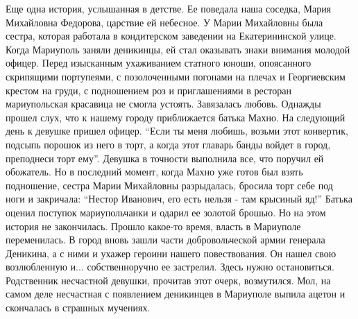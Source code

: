 Еще одна история, услышанная в детстве. Ее поведала наша соседка, Мария
Михайловна Федорова, царствие ей небесное. У Марии Михайловны была сестра,
которая работала в кондитерском заведении на Екатерининской улице. Когда
Мариуполь заняли деникинцы, ей стал оказывать знаки внимания  молодой офицер.
Перед изысканным ухаживанием статного юноши, опоясанного скрипящими портупеями,
с позолоченными погонами на плечах и Георгиевским крестом на груди, с
подношением роз и приглашениями в ресторан мариупольская красавица не смогла
устоять. Завязалась любовь. Однажды прошел слух, что к нашему городу
приближается батька Махно. На следующий день к девушке пришел офицер. \enquote{Если ты
меня любишь, возьми этот конвертик, подсыпь порошок из него в торт, а когда
этот главарь банды войдет в город, преподнеси торт ему}. Девушка в точности
выполнила все, что поручил ей обожатель. Но в последний момент, когда Махно уже
готов был взять подношение, сестра Марии Михайловны разрыдалась, бросила торт
себе под ноги и закричала: \enquote{Нестор Иванович, его есть нельзя - там крысиный
яд!} Батька оценил поступок мариупольчанки и одарил ее золотой брошью. Но на
этом история не закончилась. Прошло какое-то время, власть в Мариуполе
переменилась. В город вновь зашли части добровольческой армии генерала
Деникина, а с ними и ухажер героини нашего повествования. Он нашел свою
возлюбленную и... собственноручно ее застрелил. Здесь нужно остановиться.
Родственник несчастной девушки, прочитав этот очерк, возмутился. Мол, на самом
деле несчастная с появлением деникинцев в Мариуполе выпила ацетон и скончалась
в страшных мучениях.

